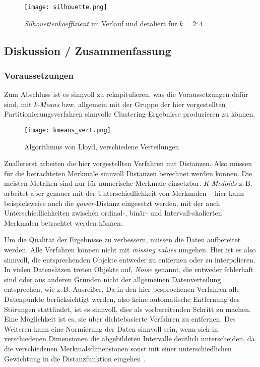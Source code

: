 \documentclass[a4paper,12pt,twoside]{article}
\newcommand{\Fachbegriff}[1]{\textit{#1}}
\begin{document}
\begin{figure}
	\centering
	\texttt{[image: silhouette.png]}
	\caption{\Fachbegriff{Silhouettenkoeffizient} im Verlauf und detaliert für $k=2:4$}
	\label{img:silhouette}
\end{figure}

\subsection{Diskussion / Zusammenfassung}


\subsubsection{Voraussetzungen}
Zum Abschluss ist es sinnvoll zu rekapitulieren, was die Voraussetzungen dafür sind, mit \Fachbegriff{k-Means} bzw. allgemein mit der Gruppe der hier vorgestellten Partitionierungsverfahren sinnvolle Clustering-Ergebnisse produzieren zu können.

\begin{figure}
	\centering
	\texttt{[image: kmeans\_vert.png]}
	\caption{Algorithmus von Lloyd, verschiedene Verteilungen}
	\label{img:kmeans_vert}
\end{figure}

Zuallererst arbeiten die hier vorgestellten Verfahren mit Distanzen. Also müssen für die betrachteten Merkmale sinnvoll Distanzen berechnet werden können. Die meisten Metriken sind nur für numerische Merkmale einsetzbar. \Fachbegriff{K-Medoids} z.\,B. arbeitet aber genauer mit der Unterschiedlichkeit von Merkmalen -- hier kann beispielsweise auch die \Fachbegriff{gower}-Distanz eingesetzt werden, mit der auch Unterschiedlichkeiten zwischen ordinal-, binär- und Intervall-skalierten Merkmalen betrachtet werden können.
 
Um die Qualität der Ergebnisse zu verbessern, müssen die Daten aufbereitet werden. Alle Verfahren können nicht mit \Fachbegriff{missing values} umgehen. Hier ist es also sinnvoll, die entsprechenden Objekte entweder zu entfernen oder zu interpolieren. In vielen Datensätzen treten Objekte auf, \Fachbegriff{Noise} genannt, die entweder fehlerhaft sind oder aus anderen Gründen nicht der allgemeinen Datenverteilung entsprechen, wie z.\,B. Ausreißer. Da in den hier besprochenen Verfahren alle Datenpunkte berücksichtigt werden, also keine automatische Entfernung der Störungen stattfindet, ist es sinnvoll, dies als vorbereitenden Schritt zu machen. Eine Möglichkeit ist es, sie über dichtebasierte Verfahren zu entfernen. Des Weiteren kann eine Normierung der Daten sinnvoll sein, wenn sich in verschiedenen Dimensionen die abgebildeten Intervalle deutlich unterscheiden, da die verschiedenen Merkmalsdimensionen sonst mit einer unterschiedlichen Gewichtung in die Distanzfunktion eingehen \autocite{Coates.2012}.
\end{document}
